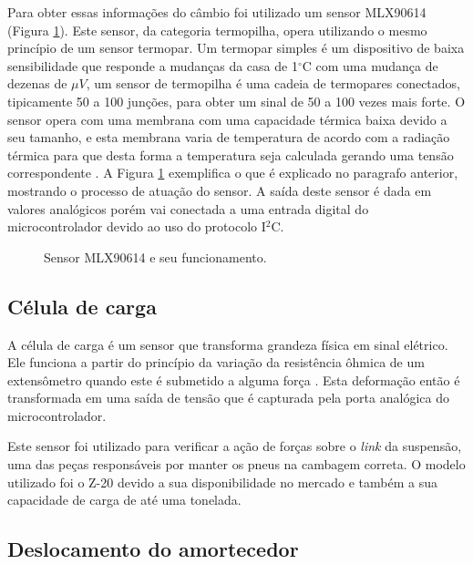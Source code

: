 Para obter essas informações do câmbio foi utilizado um sensor MLX90614 (Figura \ref{fig:sensorCvt}). Este sensor, da categoria termopilha, opera utilizando o mesmo princípio de um sensor termopar. Um termopar simples é um dispositivo de baixa sensibilidade que responde a mudanças da casa de 1$^\circ$C com uma mudança de dezenas de $\mu V$, um sensor de termopilha é uma cadeia de termopares conectados, tipicamente 50 a 100 junções, para obter um sinal de 50 a 100 vezes mais forte. O sensor opera com uma membrana com uma capacidade térmica baixa devido a seu tamanho, e esta membrana varia de temperatura de acordo com a radiação térmica para que desta forma a temperatura seja calculada gerando uma tensão correspondente \cite{Fraden2016}. A Figura \ref{fig:sensorCvt} exemplifica o que é explicado no paragrafo anterior, mostrando o processo de atuação do sensor. A saída deste sensor é dada em valores analógicos porém vai conectada a uma entrada digital do microcontrolador devido ao uso do protocolo I$^2$C.       

\begin{figure}[!htb]
	\center
	\caption{Sensor MLX90614 e seu funcionamento.}
	\qquad
	\label{fig:sensorCvt}
\end{figure}

\subsection{Célula de carga}
A célula de carga é um sensor que transforma grandeza física em sinal elétrico. Ele funciona a partir do princípio da variação da resistência ôhmica de um extensômetro quando este é submetido a alguma força \cite{Fraden2016}. Esta deformação então é transformada em uma saída de tensão que é capturada pela porta analógica do microcontrolador.

Este sensor foi utilizado para verificar a ação de forças sobre o \textit{link} da suspensão, uma das peças responsáveis por manter os pneus na cambagem correta. O modelo utilizado foi o Z-20 devido a sua disponibilidade no mercado e também a sua capacidade de carga de até uma tonelada.   

\subsection{Deslocamento do amortecedor}

